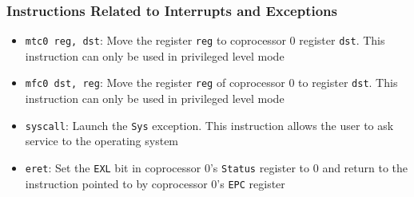 \documentclass{beamer}
\begin{document}
\begin{frame}%
\frametitle{Instructions Related to Interrupts and Exceptions}

\begin{itemize}
\item \lstinline{mtc0 reg, dst}: Move the register \lstinline+reg+ to coprocessor 0 register \lstinline+dst+. This instruction can only be used in privileged
  level mode
 \vspace{0.2cm}

\item \lstinline{mfc0 dst, reg}: Move the register \lstinline+reg+ of coprocessor 0 to register \lstinline+dst+. This instruction can only be used in privileged
  level mode
  \vspace{0.2cm}

\item \lstinline{syscall}: Launch the \texttt{Sys} exception. This instruction allows the user to ask service to the operating system
  \vspace{0.2cm}

\item \lstinline{eret}: Set the \texttt{EXL} bit in coprocessor 0's \texttt{Status} register to $0$ and return to the instruction pointed to by
  coprocessor 0's \texttt{EPC} register
\end{itemize}


\end{frame}
\end{document}

